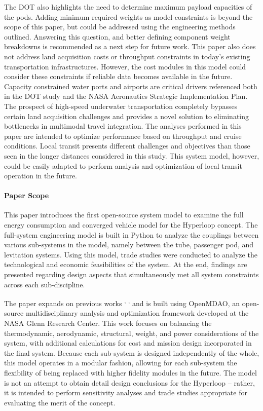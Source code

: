	The DOT also highlights the need to determine maximum payload capacities
	of the pods. Adding minimum required weights as model constraints is beyond the scope of
	this paper, but could be addressed using the engineering methods outlined.
	Answering this question, and better defining component weight breakdowns
	is recommended as a next step for future work.
	This paper also does not address land acquisition costs or throughput
	constraints in today's existing transportation infrastructures.
	However, the cost modules in this model could consider these constraints if
	reliable data becomes available in the future.
	Capacity constrained water ports and airports are critical drivers referenced
	both in the DOT study and the NASA Aeronautics Strategic
	Implementation Plan. The prospect of high-speed underwater transportation
	completely bypasses certain land acquisition challenges and provides a novel solution
	to eliminating bottlenecks in multimodal travel integration. The analyses performed in this paper
	are intended to optimize performance based on throughput and cruise conditions.
	Local transit presents different challenges and objectives than those seen in the longer distances
	considered in this study. This system model, however, could be easily adapted to perform
	analysis and optimization of local transit operation in the future.\\

\paragraph{Paper Scope}
	This paper introduces the first open-source system model to examine the
	full energy consumption and converged vehicle model for the Hyperloop concept.
	The full-system engineering model is built in Python to analyze the couplings
	between various sub-systems in the model, namely between the tube, passenger pod, and
	levitation systems. Using this model, trade studies were conducted to analyze the technological
	and economic feasibilities of the system.
	At the end, findings are presented regarding design aspects that simultaneously
	met all system constraints across each sub-discipline.

	The paper expands on previous works \cite{Chin} \textsuperscript{,}
	\cite{goodwin2009cantera}\textsuperscript{,} \cite{GrayBenchmarking2013}
	and is built using OpenMDAO, an open-source multidisciplinary analysis and
	optimization framework developed at the NASA Glenn Research Center.
	This work focuses on balancing the thermodynamic, aerodynamic, structural,
	weight, and power considerations of the system, with additional calculations for cost
	and mission design incorporated in the final system. Because each sub-system
	is designed independently of the whole, this model operates in a modular fashion, allowing
	for each sub-system the flexibility of being replaced with higher fidelity modules in the future.
	The model is not an attempt to obtain detail design conclusions for the Hyperloop
	-- rather, it is intended to perform sensitivity analyses
	and trade studies appropriate for evaluating the merit of the concept.

